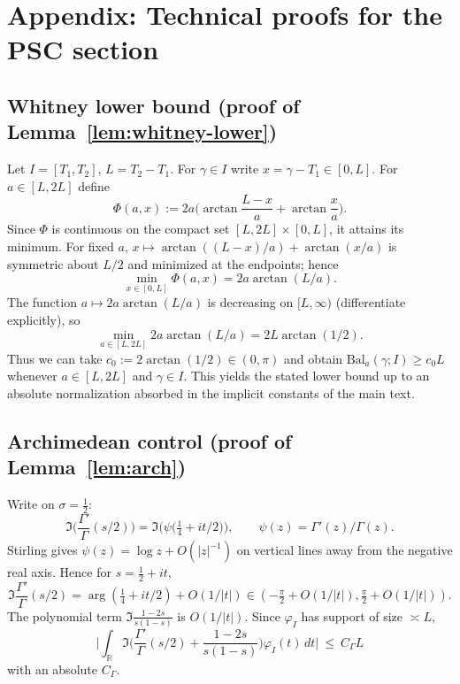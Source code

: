 \documentclass[11pt]{article}
\theoremstyle{definition}
\theoremstyle{remark}
\newcommand{\R}{\mathbb{R}}
\begin{document}
\section{Appendix: Technical proofs for the PSC section}\label{app:psc-tech}
\subsection{Whitney lower bound (proof of Lemma~\ref{lem:whitney-lower})}
Let \(I=[T_1,T_2]\), \(L=T_2-T_1\). For \(\gamma\in I\) write \(x=\gamma-T_1\in[0,L]\). For \(a\in[L,2L]\) define
\[\Phi(a,x):=2a\Big(\arctan\frac{L-x}{a}+\arctan\frac{x}{a}\Big).\]
Since \(\Phi\) is continuous on the compact set \([L,2L]\times[0,L]\), it attains its minimum. For fixed \(a\), \(x\mapsto\arctan((L-x)/a)+\arctan(x/a)\) is symmetric about \(L/2\) and minimized at the endpoints; hence
\[\min_{x\in[0,L]}\Phi(a,x)=2a\arctan(L/a).\]
The function \(a\mapsto 2a\arctan(L/a)\) is decreasing on \([L,\infty)\) (differentiate explicitly), so
\[\min_{a\in[L,2L]}2a\arctan(L/a)=2L\arctan(1/2).\]
Thus we can take \(c_0:=2\arctan(1/2)\in(0,\pi)\) and obtain \(\mathrm{Bal}_a(\gamma;I)\ge c_0 L\) whenever \(a\in[L,2L]\) and \(\gamma\in I\). This yields the stated lower bound up to an absolute normalization absorbed in the implicit constants of the main text.
\subsection{Archimedean control (proof of Lemma~\ref{lem:arch})}
Write on \(\sigma=\tfrac12\):
\[\Im\Big(\frac{\Gamma'}{\Gamma}(s/2)\Big)=\Im\Big(\psi\big(\tfrac14+it/2\big)\Big),\qquad \psi(z)=\Gamma'(z)/\Gamma(z).\]
Stirling gives \(\psi(z)=\log z+O(|z|^{-1})\) on vertical lines away from the negative real axis. Hence for \(s=\tfrac12+it\),
\[\Im\frac{\Gamma'}{\Gamma}(s/2)=\arg(\tfrac14+it/2)+O(1/|t|)\in(-\tfrac{\pi}{2}+O(1/|t|),\tfrac{\pi}{2}+O(1/|t|)).\]
The polynomial term \(\Im\frac{1-2s}{s(1-s)}\) is \(O(1/|t|)\). Since \(\varphi_I\) has support of size \(\asymp L\),
\[\Big|\int_{\R}\Im\Big(\frac{\Gamma'}{\Gamma}(s/2)+\frac{1-2s}{s(1-s)}\Big)\varphi_I(t)\,dt\Big|\ \le\ C_\Gamma L\]
with an absolute \(C_\Gamma\).
\end{document}
